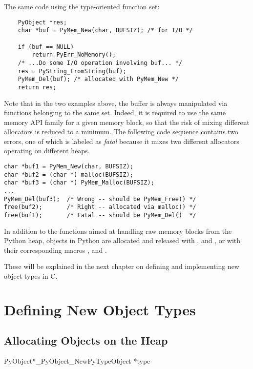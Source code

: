 \documentclass{manual}
\begin{document}
The same code using the type-oriented function set:

\begin{verbatim}
    PyObject *res;
    char *buf = PyMem_New(char, BUFSIZ); /* for I/O */

    if (buf == NULL)
        return PyErr_NoMemory();
    /* ...Do some I/O operation involving buf... */
    res = PyString_FromString(buf);
    PyMem_Del(buf); /* allocated with PyMem_New */
    return res;
\end{verbatim}

Note that in the two examples above, the buffer is always
manipulated via functions belonging to the same set. Indeed, it
is required to use the same memory API family for a given
memory block, so that the risk of mixing different allocators is
reduced to a minimum. The following code sequence contains two errors,
one of which is labeled as \emph{fatal} because it mixes two different
allocators operating on different heaps.

\begin{verbatim}
char *buf1 = PyMem_New(char, BUFSIZ);
char *buf2 = (char *) malloc(BUFSIZ);
char *buf3 = (char *) PyMem_Malloc(BUFSIZ);
...
PyMem_Del(buf3);  /* Wrong -- should be PyMem_Free() */
free(buf2);       /* Right -- allocated via malloc() */
free(buf1);       /* Fatal -- should be PyMem_Del()  */
\end{verbatim}

In addition to the functions aimed at handling raw memory blocks from
the Python heap, objects in Python are allocated and released with
,  and
, or with their corresponding macros
,  and
.

These will be explained in the next chapter on defining and
implementing new object types in C.


\chapter{Defining New Object Types \label{newTypes}}


\section{Allocating Objects on the Heap
         \label{allocating-objects}}

\begin{cfuncdesc}{PyObject*}{_PyObject_New}{PyTypeObject *type}
\end{cfuncdesc}
\end{document}
